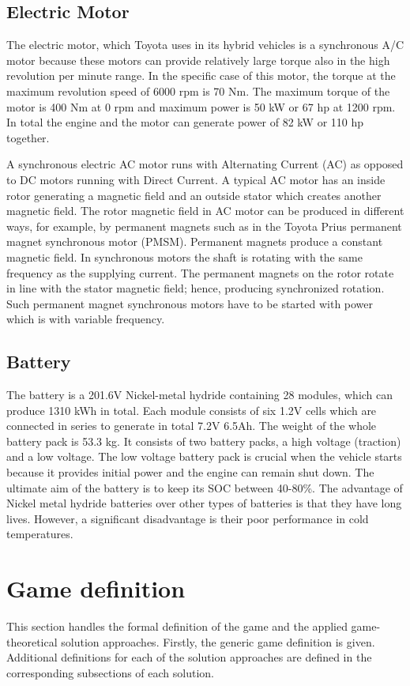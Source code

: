 \subsection{Electric Motor}
The electric motor, which Toyota uses in its hybrid vehicles is a synchronous A/C motor because these motors can provide relatively large torque also in the high revolution per minute range. In the specific case of this motor, the torque at the maximum revolution speed of 6000 rpm is 70 Nm. The maximum torque of the motor is 400 Nm at 0 rpm and maximum power is 50 kW or 67 hp at 1200 rpm. In total the engine and the motor can generate power of 82 kW or 110 hp together.

A synchronous electric AC motor runs with Alternating Current (AC) as opposed to DC motors running with Direct Current. A typical AC motor has an inside rotor generating a magnetic field and an outside stator which creates another magnetic field. The rotor magnetic field in AC motor can be produced in different ways, for example, by permanent magnets such as in the Toyota Prius permanent magnet synchronous motor (PMSM). Permanent magnets produce a constant magnetic field. In synchronous motors the shaft is rotating with the same frequency as the supplying current. The permanent magnets on the rotor rotate in line with the stator magnetic field; hence, producing synchronized rotation. Such permanent magnet synchronous motors have to be started with power which is with variable frequency.

\subsection{Battery}
The battery is a 201.6V Nickel-metal hydride containing 28 modules, which can produce 1310 kWh in total. Each module consists of six 1.2V cells which are connected in series to generate in total 7.2V 6.5Ah. The weight of the whole battery pack is 53.3 kg. It consists of two battery packs, a high voltage (traction) and a low voltage. The low voltage battery pack is crucial when the vehicle starts because it provides initial power and the engine can remain shut down. The ultimate aim of the battery is to keep its SOC between 40-80\%. The advantage of Nickel metal hydride batteries over other types of batteries is that they have long lives. However, a significant disadvantage is their poor performance in cold temperatures. 

\section{Game definition}
This section handles the formal definition of the game and the applied game-theoretical solution approaches. Firstly, the generic game definition is given. Additional definitions for each of the solution approaches are defined in the corresponding subsections of each solution.

